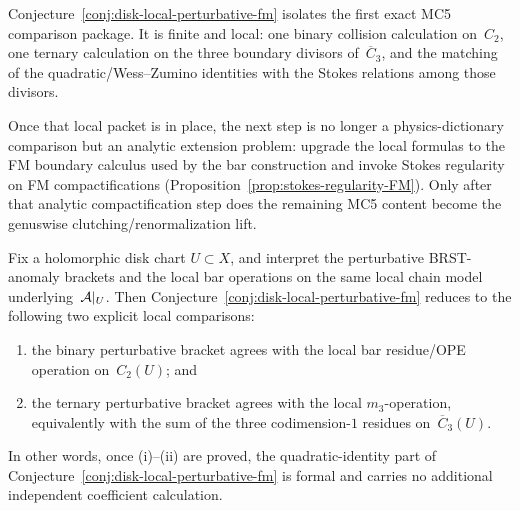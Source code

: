 \begin{remark}\label{rem:mc5-local-packet}
Conjecture~\ref{conj:disk-local-perturbative-fm} isolates the first
exact MC5 comparison package.  It is finite and local: one binary
collision calculation on~$C_2$, one ternary calculation on the three
boundary divisors of~$\overline{C}_3$, and the matching of the
quadratic/Wess--Zumino identities with the Stokes relations among those
divisors.

Once that local packet is in place, the next step is no longer a
physics-dictionary comparison but an analytic extension problem:
upgrade the local formulas to the FM boundary calculus used by the bar
construction and invoke Stokes regularity on FM compactifications
\textup{(}Proposition~\textup{\ref{prop:stokes-regularity-FM}}\textup{)}.
Only after that analytic compactification step does the remaining MC5
content become the genuswise clutching/renormalization lift.
\end{remark}

\begin{proposition}\label{prop:disk-local-binary-ternary-reduction}
Fix a holomorphic disk chart $U \subset X$, and interpret the
perturbative BRST-anomaly brackets and the local bar operations on the
same local chain model underlying~$\mathcal{A}|_U$.
Then Conjecture~\ref{conj:disk-local-perturbative-fm} reduces to the
following two explicit local comparisons:
\begin{enumerate}[label=\textup{(\roman*)}]
\item the binary perturbative bracket agrees with the local bar
  residue/OPE operation on~$C_2(U)$; and
\item the ternary perturbative bracket agrees with the local
  $m_3$-operation, equivalently with the sum of the three
  codimension-$1$ residues on~$\overline{C}_3(U)$.
\end{enumerate}
In other words, once \textup{(i)}--\textup{(ii)} are proved, the
quadratic-identity part of
Conjecture~\ref{conj:disk-local-perturbative-fm} is formal and carries
no additional independent coefficient calculation.
\end{proposition}

